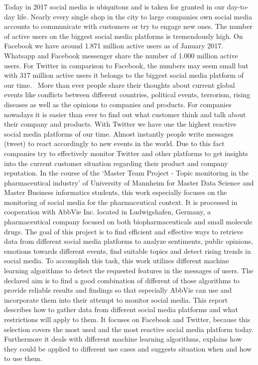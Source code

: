 \documentclass[11pt,titlepage,oneside,openany]{book}
\begin{document}
Today in 2017 social media is ubiquitous and is taken for granted in our day-to-day life. Nearly every single shop in the city to large companies own social media accounts to communicate with customers or try to engage new ones. The number of active users on the biggest social media platforms is tremendously high. On Facebook we have around 1.871 million active users as of January 2017. Whatsapp and Facebook messenger share the number of 1.000 million active users. For Twitter in comparison to Facebook, the numbers may seem small but with 317 million active users it belongs to the biggest social media platform of our time.~\cite{Chaffey2017-04-27}
\newline More than ever people share their thoughts about current global events like conflicts between different countries, political events, terrorism, rising diseases as well as the opinions to companies and products. 
For companies nowadays it is easier than ever to find out what customer think and talk about their company and products. With Twitter we have one the highest reactive social media platforms of our time. Almost instantly people write messages (tweet) to react accordingly to new events in the world. Due to this fact companies try to effectively monitor Twitter and other platforms to get insights into the current customer situation regarding their product and company reputation.
In the course of the ‘Master Team Project - Topic monitoring in the pharmaceutical industry’ of University of Mannheim for Master Data Science and Master Business informatics students, this work especially focuses on the monitoring of social media for the pharmaceutical context. It is processed in cooperation with AbbVie Inc. located in Ludwigshafen, Germany, a pharmaceutical company focused on both biopharmaceuticals and small molecule drugs. The goal of this project is to find efficient and effective ways to retrieve data from different social media platforms to analyze sentiments, public opinions, emotions towards different events, find suitable topics and detect rising trends in social media. To accomplish this task, this work utilizes different machine learning algorithms to detect the requested features in the messages of users. The declared aim is to find a good combination of different of those algorithms to provide reliable results and findings so that especially AbbVie can use and incorporate them into their attempt to monitor social media.
\newline This report describes how to gather data from different social media platforms and what restrictions will apply to them. It focuses on Facebook and Twitter, because this selection covers the most used and the most reactive social media platform today. Furthermore it deals with different machine learning algorithms, explains how they could be applied to different use cases and suggests situation when and how to use them. 
\end{document}
